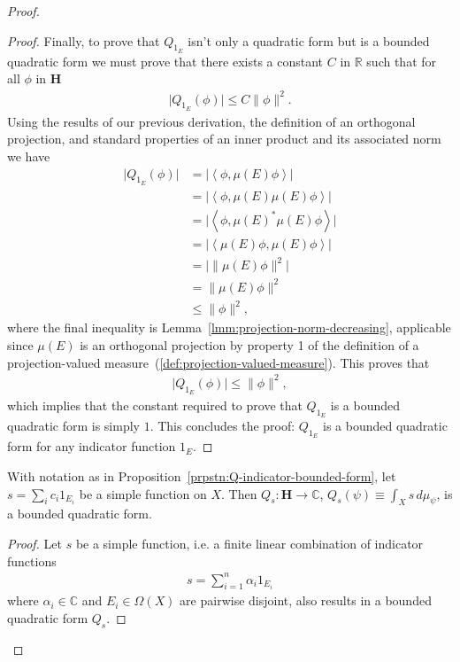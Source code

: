 \begin{proof}
\begin{proof}
Finally, to prove that $Q_{1_E}$ isn't only a quadratic form but is a bounded quadratic form we must prove that there exists a constant $C$ in $\mathbb{R}$ such that for all $\phi$ in $\mathbf{H}$
\begin{align}
    \lvert Q_{1_E}(\phi) \rvert \le C \|\phi\|^2.
\end{align}
Using the results of our previous derivation, the definition of an orthogonal projection, and standard properties of an inner product and its associated norm we have
\begin{align}
    \lvert Q_{1_E}(\phi) \rvert &= \lvert \left< \phi, \mu(E) \phi \right> \rvert \\
                    &= \lvert \left< \phi, \mu(E) \mu(E) \phi \right> \rvert \\
                    &= \lvert \left< \phi, \mu(E)^* \mu(E) \phi \right> \rvert \\
                    &= \lvert \left< \mu(E) \phi, \mu(E) \phi \right> \rvert \\
                    &= \lvert \|\mu(E) \phi\|^2 \rvert \\
                    &= \|\mu(E) \phi\|^2 \\
                    &\le \|\phi\|^2,
\end{align}
where the final inequality is Lemma~\ref{lmm:projection-norm-decreasing}, applicable since $\mu(E)$ is an orthogonal projection by property 1 of the definition of a projection-valued measure~(\ref{def:projection-valued-measure}). This proves that
\begin{align}
    \lvert Q_{1_E}(\phi) \rvert \le \|\phi\|^2,
\end{align}
which implies that the constant required to prove that $Q_{1_E}$ is a bounded quadratic form is simply $1$. This concludes the proof: $Q_{1_E}$ is a bounded quadratic form for any indicator function $1_E$.
\end{proof}

\begin{proposition}
    \label{prpstn:Q-simple-bounded-form}
    \leanok
    With notation as in Proposition~\ref{prpstn:Q-indicator-bounded-form}, let $s = \sum_{i} c_i 1_{E_i}$ be a simple function on $X$. Then $Q_s : \mathbf{H} \rightarrow \mathbb{C}$, $Q_s(\psi) \equiv \int_X s \, d\mu_\psi$, is a bounded quadratic form.
\end{proposition}
\begin{proof}
    \leanok
Let $s$ be a simple function, i.e. a finite linear combination of indicator functions
\begin{align}
    s = \sum_{i = 1}^n \alpha_i 1_{E_i}
\end{align}
where $\alpha_i \in \mathbb{C}$ and $E_i \in \Omega(X)$ are pairwise disjoint, also results in a bounded quadratic form $Q_s$.


\end{proof}
\end{proof}
